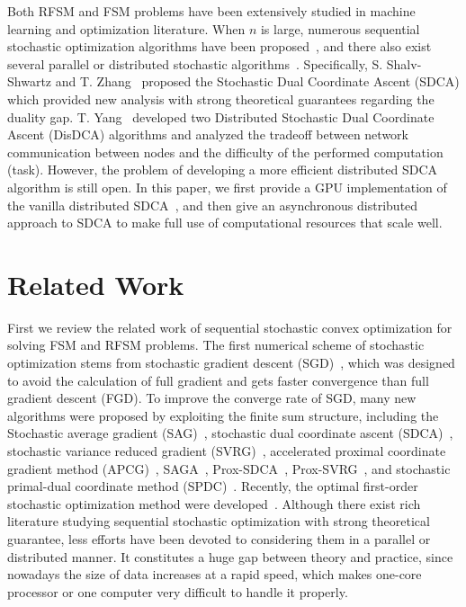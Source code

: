 \documentclass{article}
\begin{document}
Both RFSM and FSM problems have been extensively studied in machine learning and
optimization literature. When $n$ is large, numerous sequential stochastic
optimization algorithms have been
proposed~\cite{bottou2010large,nemirovski2009robust,roux2012stochastic,shalev2013stochastic,shalev2013accelerated,johnson2013accelerating,ouyang2013stochastic,
suzuki2013dual,shalev2014accelerated,xiao2014proximal,defazio2014saga,zhang2015stochastic,lin2014accelerated,defazio2016simple,allen2016katyusha,lan2015optimal},
and there also exist several parallel or distributed stochastic
algorithms~\cite{boyd2011distributed,recht2011hogwild,zinkevich2010parallelized,yang2013trading,zhang2014asynchronous,zinkevich2010parallelized,agarwal2011distributed}.
Specifically, S. Shalv-Shwartz and T. Zhang~\cite{shalev2013stochastic} proposed
the Stochastic Dual Coordinate Ascent (SDCA) which provided new analysis with strong theoretical
guarantees regarding the duality gap. T. Yang~\cite{yang2013trading,yang2013analysis} developed two 
Distributed Stochastic Dual Coordinate Ascent (DisDCA) algorithms and analyzed
the tradeoff between network communication between nodes and the difficulty of
the performed computation (task). However, the problem of developing a more
efficient distributed SDCA algorithm is still open. In this paper, we first
provide a GPU implementation of the vanilla distributed
SDCA~\cite{yang2013trading}, and then give an asynchronous distributed approach
to SDCA to make full use of computational resources that scale well. 

\section{Related Work}
First we review the related work of sequential stochastic convex optimization
for solving FSM and RFSM problems. The first numerical scheme of stochastic
optimization stems from stochastic gradient descent
(SGD)~\cite{bottou2010large,nemirovski2009robust}, which was designed to avoid
the calculation of full gradient and gets faster convergence than full gradient
descent (FGD). To improve the converge rate of SGD, many new algorithms were
proposed by exploiting the finite sum structure, including the Stochastic
average gradient (SAG)~\cite{roux2012stochastic}, stochastic dual coordinate
ascent (SDCA)~\cite{shalev2013stochastic}, stochastic variance reduced gradient
(SVRG)~\cite{johnson2013accelerating}, accelerated proximal coordinate gradient method
(APCG)~\cite{lin2014accelerated},  SAGA~\cite{Defazio2014},
Prox-SDCA~\cite{shalev2014accelerated}, Prox-SVRG~\cite{xiao2014proximal}, and
stochastic primal-dual coordinate method (SPDC)~\cite{zhang2015stochastic}.
Recently, the optimal first-order stochastic optimization method were
developed~\cite{allen2016katyusha,lan2015optimal}. Although there exist rich
literature studying sequential stochastic optimization with strong theoretical
guarantee, less efforts have been devoted to considering them in a parallel or
distributed manner. It constitutes a huge gap between theory and practice, since
nowadays the size of data increases at a rapid speed, which makes one-core
processor or one computer very difficult to handle it properly. 
\end{document}

